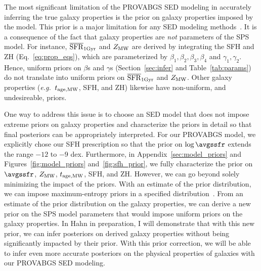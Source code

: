 The most significant limitation of the {\sc PROVABGS} SED modeling in
accurately inferring the true galaxy properties is the prior on galaxy
properties imposed by the model. 
This prior is a major limitation for any SED modeling
methods~\citep{carnall2017, leja2019}. 
It is a consequence of the fact that galaxy properties are \emph{not}
parameters of the SPS model.
For instance, $\overline{\rm SFR}_{\rm 1Gyr}$ and $Z_{\rm MW}$ are derived by integrating the SFH and ZH
(Eq.~\ref{eq:prop_eqs}), which are parameterized by $\beta_1, \beta_2, \beta_3,
\beta_4$ and $\gamma_1, \gamma_2$. 
Hence, uniform priors on $\beta$s and $\gamma$s (Section~\ref{sec:infer} and
Table~\ref{tab:params}) do not translate into uniform priors on $\overline{\rm SFR}_{\rm 1Gyr}$ and
$Z_{\rm MW}$.
Other galaxy properties (\emph{e.g.}~$t_{\rm age, MW}$, SFH, and ZH) likewise have
non-uniform, and undesireable, priors. 

One way to address this issue  is to choose an SED model that does not impose
extreme priors on galaxy properties and characterize the priors in detail so
that final posteriors can be appropriately  interpreted. 
For our {\sc PROVABGS} model, we explicitly chose our SFH prescription so that
the prior on $\log\avgssfr$ extends the range $-12$ to $-9$ dex.
Furthermore, in Appendix~\ref{sec:model_priors} and
Figures~\ref{fig:model_priors} and~\ref{fig:sfh_prior}, we fully characterize
the prior on $\avgssfr$, $Z_{\rm MW}$, $t_{\rm age, MW}$, SFH, and ZH.
However, we can go beyond solely minimizing the impact of the priors. 
With an estimate of the prior distribution, we can impose maximum-entropy
priors in a specified distribution~\citep{handley2019}. 
From an estimate of the prior distribution on the galaxy properties, we can
derive a new prior on the SPS model parameters that would impose uniform priors
on the galaxy properties. 
In Hahn in preparation, I will demonstrate that with this new prior, we can
infer posteriors on derived galaxy properties without being significantly
impacted by their prior. 
With this prior correction, we will be able to infer even more accurate
posteriors on the physical properties of galaxies with our {\sc PROVABGS} SED
modeling.

